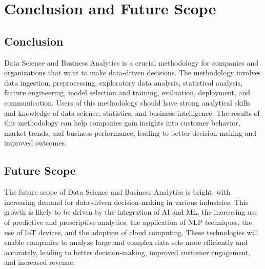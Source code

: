 \chapter{Conclusion and Future Scope}

\section{Conclusion}
\justify
\quad
Data Science and Business Analytics is a crucial methodology for companies and organizations that want to make data-driven decisions. The methodology involves data ingestion, preprocessing, exploratory data analysis, statistical analysis, feature engineering, model selection and training, evaluation, deployment, and communication. Users of this methodology should have strong analytical skills and knowledge of data science, statistics, and business intelligence. The results of this methodology can help companies gain insights into customer behavior, market trends, and business performance, leading to better decision-making and improved outcomes.

\section{Future Scope}
\justify
\quad
The future scope of Data Science and Business Analytics is bright, with increasing demand for data-driven decision-making in various industries. This growth is likely to be driven by the integration of AI and ML, the increasing use of predictive and prescriptive analytics, the application of NLP techniques, the use of IoT devices, and the adoption of cloud computing. These technologies will enable companies to analyze large and complex data sets more efficiently and accurately, leading to better decision-making, improved customer engagement, and increased revenue.
\newpage